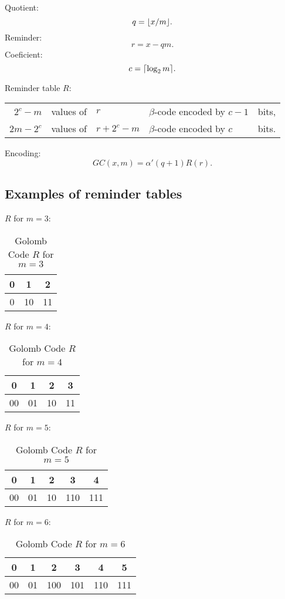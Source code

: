 \noindent
Quotient:
$$q=\lfloor x/m \rfloor.$$
Reminder:
$$r=x-qm.$$
Coeficient:
$$c=\lceil \log_2 m \rceil.$$

\noindent
Reminder table $R$:\\
\begin{tabular}{r l l l l}
    $2^c-m$ & values of & $r$ & $\beta$-code encoded by $c-1$ & bits,\\
    $2m-2^c$ & values of & $r+2^c-m$ & $\beta$-code encoded by $c$ & bits.
\end{tabular}

\noindent
Encoding:
$$GC(x,m)=\alpha'(q+1)R(r).$$

\subsection{Examples of reminder tables}
$R$ for $m=3$:

\begin{table}
\begin{tabular}{|c||c|c|}\hline
    0 & 1 & 2\\\hline
    0 & 10 & 11\\\hline
\end{tabular}
\caption{Golomb Code $R$ for $m=3$}
\end{table}

\noindent
$R$ for $m=4$:

\begin{table}
\begin{tabular}{||c|c|c|c|}\hline
    0 & 1 & 2 & 3\\\hline
    00 & 01 & 10 & 11\\\hline
\end{tabular}
\caption{Golomb Code $R$ for $m=4$}
\end{table}

\noindent
$R$ for $m=5$:

\begin{table}
\begin{tabular}{|c|c|c||c|c|}\hline
    0 & 1 & 2 & 3 & 4\\\hline
    00 & 01 & 10 & 110 & 111\\\hline
\end{tabular}
\caption{Golomb Code $R$ for $m=5$}
\end{table}

\noindent
$R$ for $m=6$:

\begin{table}
\begin{tabular}{|c|c||c|c|c|c|}\hline
    0 & 1 & 2 & 3 & 4 & 5\\\hline
    00 & 01 & 100 & 101 & 110 & 111\\\hline
\end{tabular}
\caption{Golomb Code $R$ for $m=6$}
\end{table}

